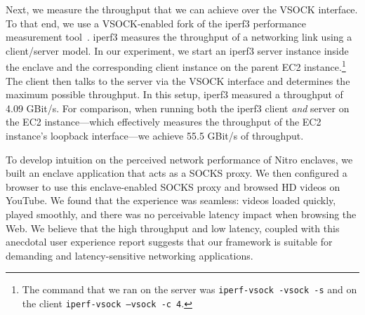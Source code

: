 Next, we measure the throughput that we can achieve over the VSOCK interface.
To that end, we use a VSOCK-enabled fork of the iperf3 performance measurement
tool~\cite{iperf-vsock}.  iperf3 measures the throughput of a networking link
using a client/server model.  In our experiment, we start an iperf3 server
instance inside the enclave and the corresponding client instance on the parent
EC2 instance.\footnote{The command that we ran on the server was
\texttt{iperf-vsock \--vsock -s} and on the client \texttt{iperf-vsock --vsock
-c 4}.} The client then talks to the server via the VSOCK interface and
determines the maximum possible throughput.  In this setup, iperf3 measured a
throughput of 4.09 GBit/s.  For comparison, when running both the iperf3 client
\emph{and} server on the EC2 instance---which effectively measures the
throughput of the EC2 instance's loopback interface---we achieve 55.5 GBit/s of
throughput.

To develop intuition on the perceived network performance of Nitro enclaves, we
built an enclave application that acts as a SOCKS proxy.  We then configured a
browser to use this enclave-enabled SOCKS proxy and browsed HD videos on
YouTube.  We found that the experience was seamless: videos loaded quickly,
played smoothly, and there was no perceivable latency impact when browsing the
Web.  We believe that the high throughput and low latency, coupled with this
anecdotal user experience report suggests that our framework is suitable for
demanding and latency-sensitive networking applications.

%
%
%
%
%
%
